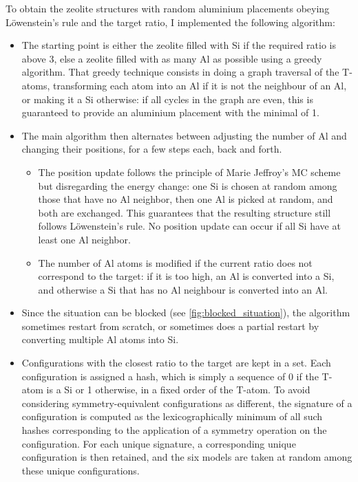 \documentclass[main.tex]{subfiles}
\begin{document}
To obtain the zeolite structures with random aluminium placements obeying L\"owenstein's rule and the target \SiAl ratio, I implemented the following algorithm:
\begin{itemize}
    \item The starting point is either the zeolite filled with Si if the required \SiAl ratio is above 3, else a zeolite filled with as many Al as possible using a greedy algorithm. That greedy technique consists in doing a graph traversal of the T-atoms, transforming each atom into an Al if it is not the neighbour of an Al, or making it a Si otherwise: if all cycles in the graph are even, this is guaranteed to provide an aluminium placement with the minimal \SiAl of 1.
    \item The main algorithm then alternates between adjusting the number of Al and changing their positions, for a few steps each, back and forth.
    \begin{itemize}
        \item The position update follows the principle of Marie Jeffroy's MC scheme but disregarding the energy change: one Si is chosen at random among those that have no Al neighbor, then one Al is picked at random, and both are exchanged. This guarantees that the resulting structure still follows L\"owenstein's rule. No position update can occur if all Si have at least one Al neighbor.
        \item The number of Al atoms is modified if the current \SiAl ratio does not correspond to the target: if it is too high, an Al is converted into a Si, and otherwise a Si that has no Al neighbour is converted into an Al.
    \end{itemize}
    \item Since the situation can be blocked (see \cref{fig:blocked_situation}), the algorithm sometimes restart from scratch, or sometimes does a partial restart by converting multiple Al atoms into Si.
    \item Configurations with the closest \SiAl ratio to the target are kept in a set. Each configuration is assigned a hash, which is simply a sequence of 0 if the T-atom is a Si or 1 otherwise, in a fixed order of the T-atom. To avoid considering symmetry-equivalent configurations as different, the signature of a configuration is computed as the lexicographically minimum of all such hashes corresponding to the application of a symmetry operation on the configuration. For each unique signature, a corresponding unique configuration is then retained, and the six models are taken at random among these unique configurations.
\end{itemize}\label{aluminiumhash}
\end{document}

